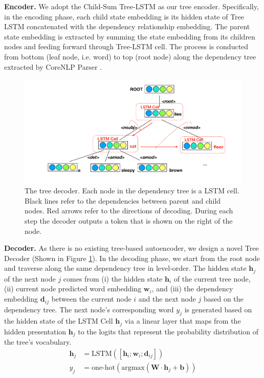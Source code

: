 \textbf{Encoder.} We adopt the Child-Sum Tree-LSTM \citep{Tai2015ImprovedSR} as our tree encoder. Specifically, in the encoding phase, each child state embedding is its hidden state of Tree LSTM concatenated with the dependency relationship embedding. 
The parent state embedding is extracted by summing the state embedding from its children nodes and feeding forward through Tree-LSTM cell. The process is conducted from bottom (leaf node, i.e. word) to top (root node) along the dependency tree extracted by CoreNLP Parser \citep{Manning2014TheSC}. 

\begin{figure}
    \centering
    \includegraphics[page=1,trim=1cm 1.5cm 1cm 1.5cm,clip,width=\linewidth]{body/tree.pdf}
    \caption{The tree decoder. Each node in the dependency tree is a LSTM cell. Black lines refer to the dependencies between parent and child nodes. Red arrows refer to the directions of decoding. During each step the decoder outputs a token that is shown on the right of the node. } 
    \label{fig:tree}
\vspace{-3mm}
\end{figure}

\textbf{Decoder.} As there is no existing tree-based autoencoder, we design a novel Tree Decoder (Shown in Figure \ref{fig:tree}). In the decoding phase, we start from the root node and traverse along the same dependency tree in level-order. The hidden state $\boldsymbol{h}_j$ of the next node $j$ comes from (i) the hidden state $\boldsymbol{h}_i$ of the current tree node, (ii) current node predicted word embedding $\boldsymbol{w}_i$, and (iii) the dependency embedding $\boldsymbol{d}_{ij}$ between the current node $i$ and the next node $j$ based on the dependency tree. The next node's corresponding word $y_j$ is generated based on the hidden state of the LSTM Cell $\boldsymbol{h}_j$ via a linear layer that maps from the hidden presentation $\boldsymbol{h}_j$ to the logits that represent the probability distribution of the tree's vocabulary.
\begin{align}
     \boldsymbol{h}_j &= \text{LSTM}([\boldsymbol{h}_i;\boldsymbol{w}_i;\boldsymbol{d}_{ij}]) \\
    y_j &=  \text{one-hot} (\text{argmax} \left( \boldsymbol{W} \cdot \boldsymbol{h}_j  + \boldsymbol{b} \right)) \label{eq:decode_word}
\end{align}


